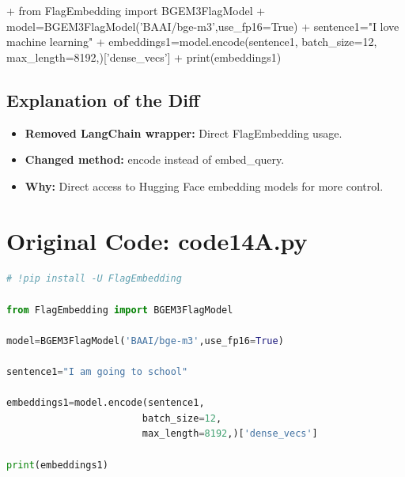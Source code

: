 \documentclass[11pt, a4paper]{article}
\begin{document}
\begin{addedcode}
\begin{diffverb}
+ from FlagEmbedding import BGEM3FlagModel
+ model=BGEM3FlagModel('BAAI/bge-m3',use_fp16=True)
+ sentence1="I love machine learning"
+ embeddings1=model.encode(sentence1, batch_size=12, max_length=8192,)['dense_vecs']
+ print(embeddings1)
\end{diffverb}
\end{addedcode}


\subsection{Explanation of the Diff}
\begin{itemize}
    \item \textbf{Removed LangChain wrapper:} Direct FlagEmbedding usage.
    \item \textbf{Changed method:} encode instead of embed\_query.
    \item \textbf{Why:} Direct access to Hugging Face embedding models for more control.
\end{itemize}


\newpage
\section{Original Code: code14A.py}
\begin{lstlisting}[language=Python]
# !pip install -U FlagEmbedding

from FlagEmbedding import BGEM3FlagModel

model=BGEM3FlagModel('BAAI/bge-m3',use_fp16=True)

sentence1="I am going to school"

embeddings1=model.encode(sentence1,
                        batch_size=12,
                        max_length=8192,)['dense_vecs']

print(embeddings1)
\end{lstlisting}
\end{document}
